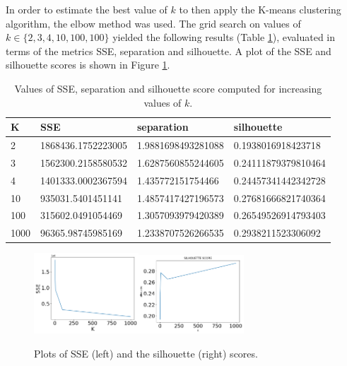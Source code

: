 \documentclass[10pt,a4paper]{report}
\begin{document}
In order to estimate the best value of $k$ to then apply the K-means clustering algorithm, the elbow method was used.
The grid search on values of $k \in \{2, 3, 4, 10, 100, 100\}$ yielded the following results (Table \ref{table02}), evaluated in terms of the metrics SSE, separation and silhouette.
A plot of the SSE and silhouette scores is shown in Figure \ref{kmeans_k}.
\begin{table}[h]
	\centering
	\begin{small}
		\begin{tabular}{l|p{4cm}|p{4cm}|p{4cm}}
		\textbf{K} & \textbf{SSE} & \textbf{separation} & \textbf{silhouette}\\
		\hline
		2 & 1868436.1752223005 & 1.9881698493281088 & 0.1938016918423718\\
		3 & 1562300.2158580532 & 1.6287560855244605 & 0.24111879379810464\\
		4 & 1401333.0002367594 & 1.435772151754466 & 0.24457341442342728\\
		10 & 935031.5401451141 & 1.4857417427196573 & 0.27681666821740364\\
		100 & 315602.0491054469 & 1.3057093979420389 & 0.26549526914793403\\
		1000 & 96365.98745985169 & 1.2338707526266535 & 0.2938211523306092\\
	\end{tabular}
	\end{small}
	\caption{Values of SSE, separation and silhouette score computed for increasing values of $k$.}
	\label{table02}
\end{table}
\begin{figure}[h]
	\centering
	\includegraphics[width=0.35\textwidth]{kmeans_sse}\includegraphics[width=0.35\textwidth]{kmeans_silhouette}
	\caption{Plots of SSE (left) and the silhouette (right) scores.}
	\label{kmeans_k}
\end{figure}
\end{document}
